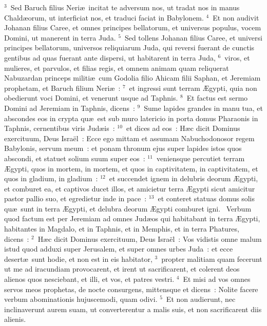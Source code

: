 ${}^{3}$~Sed Baruch filius Neri\ae\ incitat te adversum nos, ut tradat nos in manus Chald\ae orum, ut interficiat nos, et traduci faciat in Babylonem.
${}^{4}$~Et non audivit Johanan filius Caree, et omnes principes bellatorum, et universus populus, vocem Domini, ut manerent in terra Juda.
${}^{5}$~Sed tollens Johanan filius Caree, et universi principes bellatorum, universos reliquiarum Juda, qui reversi fuerant de cunctis gentibus ad quas fuerant ante dispersi, ut habitarent in terra Juda,
${}^{6}$~viros, et mulieres, et parvulos, et filias regis, et omnem animam quam reliquerat Nabuzardan princeps militi\ae\ cum Godolia filio Ahicam filii Saphan, et Jeremiam prophetam, et Baruch filium Neri\ae~:
${}^{7}$~et ingressi sunt terram \AE gypti, quia non obedierunt voci Domini, et venerunt usque ad Taphnis.
${}^{8}$~Et factus est sermo Domini ad Jeremiam in Taphnis, dicens~:
${}^{9}$~Sume lapides grandes in manu tua, et abscondes eos in crypta qu\ae\ est sub muro latericio in porta domus Pharaonis in Taphnis, cernentibus viris Jud\ae is~:
${}^{10}$~et dices ad eos~: H\ae c dicit Dominus exercituum, Deus Isra\"el~: Ecce ego mittam et assumam Nabuchodonosor regem Babylonis, servum meum~: et ponam thronum ejus super lapides istos quos abscondi, et statuet solium suum super eos~:
${}^{11}$~veniensque percutiet terram \AE gypti, quos in mortem, in mortem, et quos in captivitatem, in captivitatem, et quos in gladium, in gladium~:
${}^{12}$~et succendet ignem in delubris deorum \AE gypti, et comburet ea, et captivos ducet illos, et amicietur terra \AE gypti sicut amicitur pastor pallio suo, et egredietur inde in pace~:
${}^{13}$~et conteret statuas domus solis qu\ae\ sunt in terra \AE gypti, et delubra deorum \AE gypti comburet igni.
~Verbum quod factum est per Jeremiam ad omnes Jud\ae os qui habitabant in terra \AE gypti, habitantes in Magdalo, et in Taphnis, et in Memphis, et in terra Phatures, dicens~:
${}^{2}$~H\ae c dicit Dominus exercituum, Deus Isra\"el~: Vos vidistis omne malum istud quod adduxi super Jerusalem, et super omnes urbes Juda~: et ecce desert\ae\ sunt hodie, et non est in eis habitator,
${}^{3}$~propter malitiam quam fecerunt ut me ad iracundiam provocarent, et irent ut sacrificarent, et colerent deos alienos quos nesciebant, et illi, et vos, et patres vestri.
${}^{4}$~Et misi ad vos omnes servos meos prophetas, de nocte consurgens, mittensque et dicens~: Nolite facere verbum abominationis hujuscemodi, quam odivi.
${}^{5}$~Et non audierunt, nec inclinaverunt aurem suam, ut converterentur a malis suis, et non sacrificarent diis alienis.

